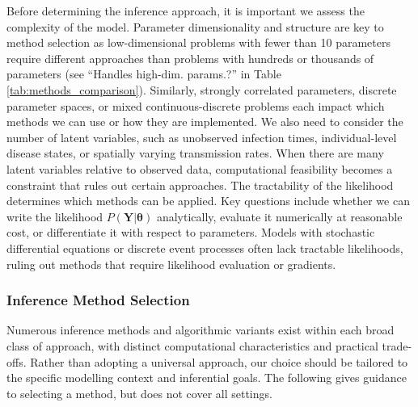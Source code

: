 \documentclass{article}
\begin{document}
Before determining the inference approach, it is important we assess the complexity of the model.
Parameter dimensionality and structure are key to method selection as low-dimensional problems with fewer than 10 parameters require different approaches than problems with hundreds or thousands of parameters (see ``Handles high-dim. params.?'' in Table \ref{tab:methods_comparison}).
Similarly, strongly correlated parameters, discrete parameter spaces, or mixed continuous-discrete problems each impact which methods we can use or how they are implemented.
We also need to consider the number of latent variables, such as unobserved infection times, individual-level disease states, or spatially varying transmission rates.
When there are many latent variables relative to observed data, computational feasibility becomes a constraint that rules out certain approaches.
The tractability of the likelihood determines which methods can be applied.
Key questions include whether we can write the likelihood $P(\boldsymbol{Y}|\boldsymbol{\theta})$ analytically, evaluate it numerically at reasonable cost, or differentiate it with respect to parameters.
Models with stochastic differential equations or discrete event processes often lack tractable likelihoods, ruling out methods that require likelihood evaluation or gradients.

\subsubsection{Inference Method Selection}

Numerous inference methods and algorithmic variants exist within each broad class of approach, with distinct computational characteristics and practical trade-offs.
Rather than adopting a universal approach, our choice should be tailored to the specific modelling context and inferential goals.
The following gives guidance to selecting a method, but does not cover all settings.
\end{document}
